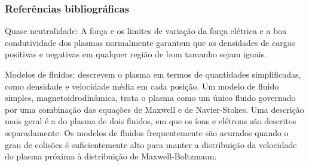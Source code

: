 \documentclass[aspectratio=169]{beamer}
\begin{document}
\begin{frame}
		\frametitle{Refer\^{e}ncias bibliogr\'{a}ficas}
		
		
		
		
		
	\end{frame}
\begin{frame}
Quase neutralidade: A força e os limites de variação da força elétrica e a boa condutividade dos plasmas normalmente garantem que as densidades de cargas positivas e negativas em qualquer região de bom tamanho sejam iguais.
\end{frame}
\begin{frame}
Modelos de fluidos: descrevem o plasma em termos de quantidades simplificadas, como densidade e velocidade média em cada posição. Um modelo de fluido simples, magnetoidrodinâmica, trata o plasma como um único fluido governado por uma combinação das equações de Maxwell e de Navier-Stokes. Uma descrição mais geral é a do plasma de dois fluidos, em que os íons e elétrons são descritos separadamente. Os modelos de fluidos frequentemente são acurados quando o grau de colisões é suficientemente alto para manter a distribuição da velocidade do plasma próxima à distribuição de Maxwell-Boltzmann.
\end{frame}
\end{document}

